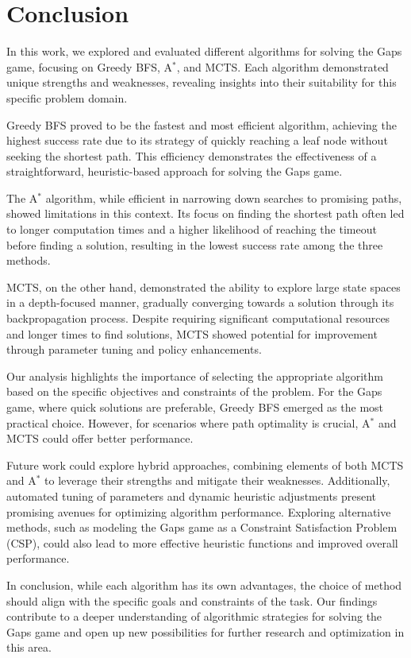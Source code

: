 \chapter{Conclusion}
In this work, we explored and evaluated different algorithms for solving the Gaps game, focusing on Greedy BFS, A$^*$, and MCTS. Each algorithm demonstrated unique strengths and weaknesses, revealing insights into their suitability for this specific problem domain.

Greedy BFS proved to be the fastest and most efficient algorithm, achieving the highest success rate due to its strategy of quickly reaching a leaf node without seeking the shortest path. This efficiency demonstrates the effectiveness of a straightforward, heuristic-based approach for solving the Gaps game.

The A$^*$ algorithm, while efficient in narrowing down searches to promising paths, showed limitations in this context. Its focus on finding the shortest path often led to longer computation times and a higher likelihood of reaching the timeout before finding a solution, resulting in the lowest success rate among the three methods.

MCTS, on the other hand, demonstrated the ability to explore large state spaces in a depth-focused manner, gradually converging towards a solution through its backpropagation process. Despite requiring significant computational resources and longer times to find solutions, MCTS showed potential for improvement through parameter tuning and policy enhancements.

Our analysis highlights the importance of selecting the appropriate algorithm based on the specific objectives and constraints of the problem. For the Gaps game, where quick solutions are preferable, Greedy BFS emerged as the most practical choice. However, for scenarios where path optimality is crucial, A$^*$ and MCTS could offer better performance.

Future work could explore hybrid approaches, combining elements of both MCTS and A$^*$ to leverage their strengths and mitigate their weaknesses. Additionally, automated tuning of parameters and dynamic heuristic adjustments present promising avenues for optimizing algorithm performance. Exploring alternative methods, such as modeling the Gaps game as a Constraint Satisfaction Problem (CSP), could also lead to more effective heuristic functions and improved overall performance.

In conclusion, while each algorithm has its own advantages, the choice of method should align with the specific goals and constraints of the task. Our findings contribute to a deeper understanding of algorithmic strategies for solving the Gaps game and open up new possibilities for further research and optimization in this area.

